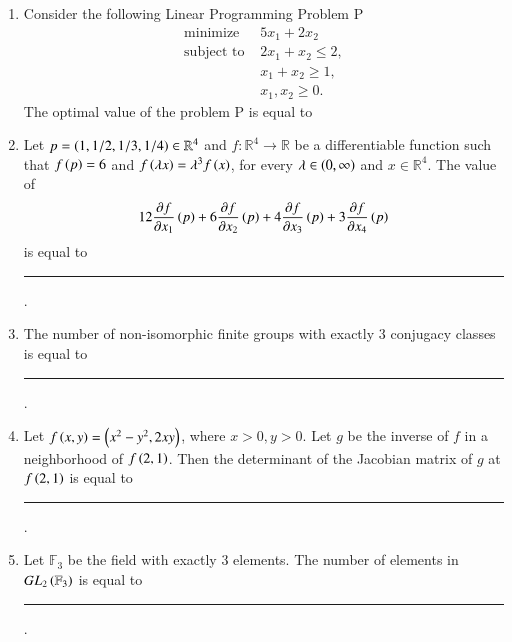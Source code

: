 \documentclass[journal,12pt,onecolumn]{IEEEtran}
\theoremstyle{remark}
\begin{document}
\begin{enumerate}
\item Consider the following Linear Programming Problem P
\begin{align*}
    \text{minimize } & 5x_1 + 2x_2 \\
    \text{subject to } & 2x_1 + x_2 \le 2, \\
    & x_1 + x_2 \ge 1, \\
    & x_1, x_2 \ge 0.
\end{align*}
The optimal value of the problem P is equal to \hfill{}
\begin{enumerate}
\end{enumerate}

\item Let $p = \left(1, 1/2, 1/3, 1/4\right) \in \mathbb{R}^4$ and $f \colon \mathbb{R}^4 \to \mathbb{R}$ be a differentiable function such that $f\left(p\right) = 6$ and $f\left(\lambda x\right) = \lambda^3 f\left(x\right)$, for every $\lambda \in \left(0, \infty\right)$ and $x \in \mathbb{R}^4$. The value of
\[ 12\frac{\partial f}{\partial x_1}\left(p\right) + 6\frac{\partial f}{\partial x_2}\left(p\right) + 4\frac{\partial f}{\partial x_3}\left(p\right) + 3\frac{\partial f}{\partial x_4}\left(p\right) \]
is equal to \rule{3cm}{0.15mm} . \hfill{}

\item The number of non-isomorphic finite groups with exactly $3$ conjugacy classes is equal to \rule{3cm}{0.15mm} . \hfill{}

\item Let $f\left(x, y\right) = \left(x^2 - y^2, 2xy\right)$, where $x > 0, y > 0$. Let $g$ be the inverse of $f$ in a neighborhood of $f\left(2, 1\right)$. Then the determinant of the Jacobian matrix of $g$ at $f\left(2, 1\right)$ is equal to \rule{3cm}{0.15mm} . \hfill{}

\item Let $\mathbb{F}_3$ be the field with exactly $3$ elements. The number of elements in $GL_2\left(\mathbb{F}_3\right)$ is equal to \rule{3cm}{0.15mm} . \hfill{}


\end{enumerate}
\end{document}
